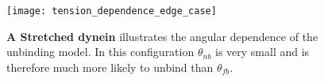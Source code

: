 	\begin{figure}[!hbt]
		\centering
		\texttt{[image: tension\_dependence\_edge\_case]}
		\caption{\textbf{A Stretched dynein} illustrates the angular dependence of the unbinding model. In this configuration $\theta_{nb}$ is very small and is therefore much more likely to unbind than $\theta_{fb}$.}
	\end{figure}
	
	
	
	
	
	
	
	
	
	
	
	
	
	
	
	